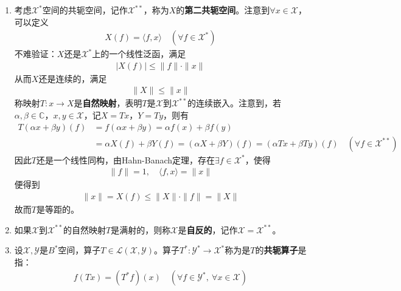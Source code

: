 \begin{enumerate}[leftmargin=2cm, label=\arabic*]
		\item 考虑$\mathscr{X}^*$空间的共轭空间，记作$\mathscr{X}^{**}$，称为$X$的\textbf{第二共轭空间}。注意到$\forall x\in \mathscr{X}$，可以定义
		\begin{align*}
			X(f) = \langle f,x\rangle\quad (\forall f\in \mathscr{X}^*)
		\end{align*}
		不难验证：$X$还是$\mathscr{X}^*$上的一个线性泛函，满足
		\begin{align*}
			|X(f)| \leqslant \|f\|\cdot \|x\|
		\end{align*}
		从而$X$还是连续的，满足
		\begin{align*}
			\|X\| \leqslant \|x\|
		\end{align*}
		称映射$T:x\to X$是\textbf{自然映射}，表明$T$是$\mathscr{X}$到$\mathscr{X}^{**}$的连续嵌入。注意到，若$\alpha,\beta\in\mathbb{C}$，$x,y\in\mathscr{X}$，记$X = Tx$，$Y = Ty$，则有
		\begin{align*}
			T(\alpha x+ \beta y)(f) &= f(\alpha x+ \beta y) = \alpha f(x) + \beta f(y) \\
			&= \alpha X(f) + \beta Y(f) = (\alpha X + \beta Y)(f) = (\alpha Tx+ \beta T y)(f)\quad (\forall f\in\mathscr{X}^{**})
		\end{align*}
		因此$T$还是一个线性同构，由Hahn-Banach定理，存在$\exists f\in\mathscr{X}^*$，使得
		\begin{align*}
			\|f\| = 1,\quad \langle f,x\rangle = \|x\|
		\end{align*}
		便得到
		\begin{align*}
			\|x\| = X(f) \leqslant \|X\|\cdot\|f\| = \|X\|
		\end{align*}
		故而$T$是等距的。
		
		\item 如果$\mathscr{X}$到$\mathscr{X}^{**}$的自然映射$T$是满射的，则称$\mathscr{X}$是\textbf{自反的}，记作$\mathscr{X} = \mathscr{X}^{**}$。
		
		\item 设$\mathscr{X},\mathscr{Y}$是$B^*$空间，算子$T\in\mathscr{L}(\mathscr{X},\mathscr{Y})$。算子$T^*:\mathscr{Y}^*\to\mathscr{X}^*$称为是$T$的\textbf{共轭算子}是指：
		\begin{align*}
			f(Tx) = (T^*f)(x) \quad (\forall f\in \mathscr{Y}^*,\ \forall x\in \mathscr{X})
		\end{align*}
		
		
		
		
	\end{enumerate}
	
